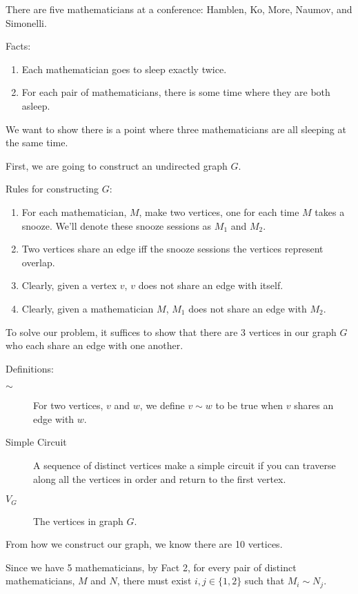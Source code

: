 \documentclass[fleqn]{article}
\begin{document}
There are five mathematicians at a conference: Hamblen, Ko, More, Naumov, and Simonelli.

Facts:
\begin{enumerate}
  \item  Each mathematician goes to sleep exactly twice.

  \item  For each pair of mathematicians, there is some time where
         they are both asleep.
\end{enumerate}

We want to show there is a point where three mathematicians are all sleeping at the same time.

First, we are going to construct an undirected graph $G$.

Rules for constructing $G$:
\begin{enumerate}
  \item For each mathematician, $M$, make two vertices, one for each
        time $M$ takes a snooze. We'll denote these snooze sessions
        as $M_1$ and $M_2$.
  \item Two vertices share an edge iff the snooze sessions the vertices
        represent overlap.
  \item Clearly, given a vertex $v$, $v$ does not share an edge with
        itself.
  \item Clearly, given a mathematician $M$, $M_1$ does not share an
        edge with $M_2$.
\end{enumerate}

To solve our problem, it suffices to show that there are 3 vertices in our graph $G$ who each share an edge with one another.

Definitions:
\begin{description}
  \item[$\sim$] For two vertices, $v$ and $w$, we define $v \sim w$
                to be true when $v$ shares an edge with $w$.
  \item[Simple Circuit] A sequence of distinct vertices make a 
                        simple circuit if you can traverse along
                        all the vertices in order and 
                        return to the first vertex.
  \item[$V_G$] The vertices in graph $G$.
\end{description}

From how we construct our graph, we know there are 10 vertices.

Since we have 5 mathematicians, by Fact 2, for every pair of distinct mathematicians, $M$ and $N$, there must exist $i,j \in \lbrace 1,2 \rbrace$ such that $M_i \sim N_j$.
\end{document}
